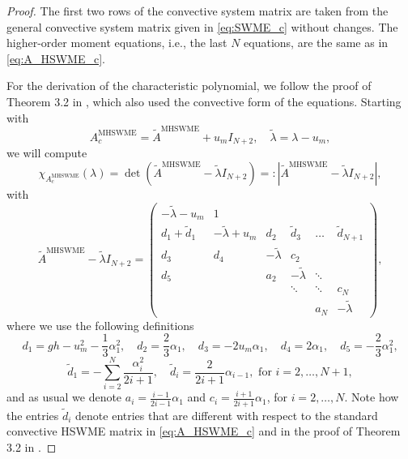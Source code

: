 \documentclass[a4paper, 11pt]{article}
\begin{document}
\begin{proof}
    The first two rows of the convective system matrix are taken from the general convective system matrix given in \eqref{eq:SWME_c} without changes. The higher-order moment equations, i.e., the last $N$ equations, are the same as in \eqref{eq:A_HSWME_c}.

    For the derivation of the characteristic polynomial, we follow the proof of Theorem 3.2 in \cite{Koellermeier2020c}, which also used the convective form of the equations.
    Starting with
    \begin{equation}
       A^{\textrm{MHSWME}}_{c} = \widetilde{A}^{\textrm{MHSWME}} + u_m I_{N+2}, \quad \widetilde{\lambda} = \lambda - u_m,
    \end{equation}
    we will compute
    \begin{equation}
       \chi_{A^{\textrm{MHSWME}}_{c}}(\lambda) = \det\left( \widetilde{A}^{\textrm{MHSWME}} - \widetilde{\lambda} I_{N+2} \right) =: \left| \widetilde{A}^{\textrm{MHSWME}} - \widetilde{\lambda} I_{N+2} \right|,
    \end{equation}
    with
    \begin{equation}
        \widetilde{A}^{\textrm{MHSWME}} - \widetilde{\lambda} I_{N+2} = \left(\begin{array}{cccccc}
        - \widetilde{\lambda}-u_m & 1 &  &  &  &  \\
        d_1 + \widetilde{d}_{1} & - \widetilde{\lambda} + u_m & d_2 & \widetilde{d}_{3} & \dots & \widetilde{d}_{{N+1}} \\
        d_3 & d_4 & - \widetilde{\lambda} & c_2 & &\\
        d_5 &   & a_2 & - \widetilde{\lambda} & \ddots & \\
         &  &  & \ddots & \ddots & c_N \\
         &  &  &  & a_N & - \widetilde{\lambda}
        \end{array}\right),
    \end{equation}
    where we use the following definitions
    \begin{equation}
        d_1 = gh - u_m^2 -\frac{1}{3}\alpha_1^2, \quad d_2 = \frac{2}{3}\alpha_1, \quad d_3 = -2 u_m \alpha_1, \quad d_4 = 2\alpha_1, \quad d_5 = -\frac{2}{3}\alpha_1^2,
    \end{equation}
    \begin{equation}
       \widetilde{d}_{1} = - \sum\limits_{i=2}^N \frac{\alpha_i^2}{2i+1}, \quad \widetilde{d}_{i} = \frac{2}{2i+1}\alpha_{i-1}, \textrm{ for } i=2,\ldots, N+1,
    \end{equation}
    and as usual we denote $a_i = \frac{i-1}{2i-1}\alpha_1$ and $c_i = \frac{i+1}{2i+1}\alpha_1$, for $i=2,\ldots, N$.
    Note how the entries $\widetilde{d}_{i}$ denote entries that are different with respect to the standard convective HSWME matrix in \eqref{eq:A_HSWME_c} and in the proof of Theorem 3.2 in \cite{Koellermeier2020c}.


\end{proof}
\end{document}
